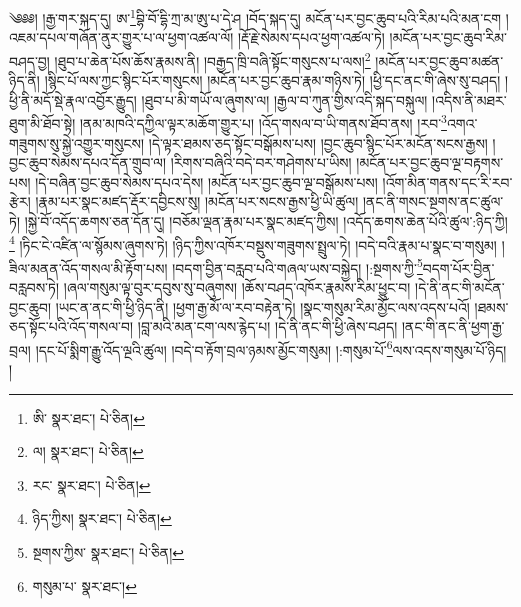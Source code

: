 \setcounter{footnote}{0} 
༄༅༅། །རྒྱ་གར་སྐད་དུ། ཨ་\footnote{ཨི་  སྣར་ཐང་།  པེ་ཅིན། }བྷི་བོ་དྷི་ཀྲ་མ་ཨུ་པ་དེ་ཤ །བོད་སྐད་དུ། མངོན་པར་བྱང་ཆུབ་པའི་རིམ་པའི་མན་ངག །འཇམ་དཔལ་གཞོན་ནུར་གྱུར་པ་ལ་ཕྱག་འཚལ་ལོ། །རྡོ་རྗེ་སེམས་དཔའ་ཕྱག་འཚལ་ཏེ། །མངོན་པར་བྱང་ཆུབ་རིམ་བཤད་བྱ། །ཐུབ་པ་ཆེན་པོས་ཆོས་རྣམས་ནི། །བརྒྱད་ཁྲི་བཞི་སྟོང་གསུངས་པ་ལས།\footnote{ལ།  སྣར་ཐང་།  པེ་ཅིན། } །མངོན་པར་བྱང་ཆུབ་མཚན་ཉིད་ནི། །སྙིང་པོ་ལས་ཀྱང་སྙིང་པོར་གསུངས། །མངོན་པར་བྱང་ཆུབ་རྣམ་གཉིས་ཏེ། །ཕྱི་དང་ནང་གི་ཞེས་སུ་བཤད། །ཕྱི་ནི་མདོ་སྡེ་རྣལ་འབྱོར་རྒྱུད། །ཐུབ་པ་མི་གཡོ་ལ་ཞུགས་ལ། །རྒྱལ་བ་ཀུན་གྱིས་འདི་སྐད་བསྐུལ། །འདིས་ནི་མཐར་ཐུག་མི་ཐོབ་སྟེ། །ནམ་མཁའི་དཀྱིལ་ལྟར་མཆོག་གྱུར་པ། །འོད་གསལ་བ་ཡི་གནས་ཐོབ་ནས། །རབ་\footnote{རང་  སྣར་ཐང་།  པེ་ཅིན། }འགའ་གཟུགས་སུ་སྐྱེ་འགྱུར་གསུངས། །དེ་ལྟར་ཐམས་ཅད་སྟོང་བསྒོམས་པས། །བྱང་ཆུབ་སྙིང་པོར་མངོན་སངས་རྒྱས། །བྱང་ཆུབ་སེམས་དཔའ་དོན་གྲུབ་ལ། །རིགས་བཞིའི་བདེ་བར་གཤེགས་པ་ཡིས། །མངོན་པར་བྱང་ཆུབ་ལྔ་བརྟགས་པས། །དེ་བཞིན་བྱང་ཆུབ་སེམས་དཔའ་དེས། །མངོན་པར་བྱང་ཆུབ་ལྔ་བསྒོམས་པས། །འོག་མིན་གནས་དང་རི་རབ་རྩེར། །རྣམ་པར་སྣང་མཛད་རྡོར་དབྱིངས་སུ། །མངོན་པར་སངས་རྒྱས་ཕྱི་ཡི་ཚུལ། །ནང་ནི་གསང་སྔགས་ནང་ཚུལ་ཏེ། །སྐྱེ་བོ་འདོད་ཆགས་ཅན་དོན་དུ། །བཅོམ་ལྡན་རྣམ་པར་སྣང་མཛད་ཀྱིས། །འདོད་ཆགས་ཆེན་པོའི་ཚུལ་:ཉིད་ཀྱི།\footnote{ཉིད་ཀྱིས།  སྣར་ཐང་།  པེ་ཅིན། } །ཏིང་ངེ་འཛིན་ལ་སྙོམས་ཞུགས་ཏེ། །ཉིད་ཀྱིས་འཁོར་བསྡུས་གཟུགས་སྤྲུལ་ཏེ། །བདེ་བའི་རྣམ་པ་སྣང་བ་གསུམ། །ཟིལ་མནན་འོད་གསལ་མི་རྟོག་པས། །བདག་བྱིན་བརླབ་པའི་གཞལ་ཡས་བསྐྱེད། །:སྔགས་ཀྱི་\footnote{སྔགས་ཀྱིས་  སྣར་ཐང་།  པེ་ཅིན། }བདག་པོར་བྱིན་བརླབས་ཏེ། །ཞལ་གསུམ་ལྟ་བུར་དབུས་སུ་བཞུགས། །ཆོས་བཤད་འཁོར་རྣམས་རིམ་ཕྱུང་བ། །དེ་ནི་ནང་གི་མངོན་བྱང་ཆུབ། །ཡང་ན་ནང་གི་ཕྱི་ཉིད་ནི། །ཕྱག་རྒྱ་མོ་ལ་རབ་བརྟེན་ཏེ། །སྣང་གསུམ་རིམ་མྱོང་ལས་འདས་པའོ། །ཐམས་ཅད་སྟོང་པའི་འོད་གསལ་བ། །བླ་མའི་མན་ངག་ལས་རྙེད་པ། །དེ་ནི་ནང་གི་ཕྱི་ཞེས་བཤད། །ནང་གི་ནང་ནི་ཕྱག་རྒྱ་བྲལ། །དང་པོ་སྨིག་རྒྱུ་འོད་ལྔའི་ཚུལ། །བདེ་བ་རྟོག་བྲལ་ཉམས་མྱོང་གསུམ། །:གསུམ་པོ་\footnote{གསུམ་པ་  སྣར་ཐང་། }ལས་འདས་གསུམ་པོ་ཉིད། །
